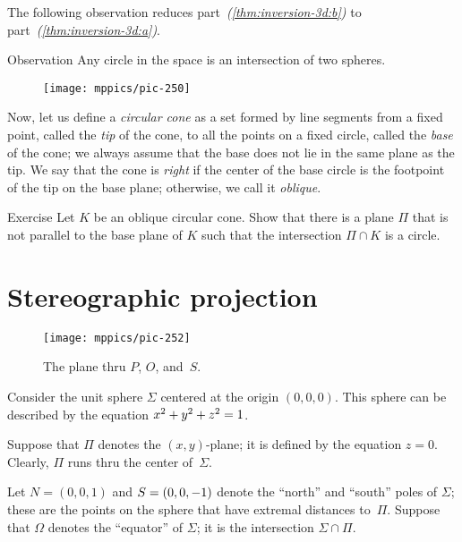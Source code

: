 The following observation reduces part~\textit{(\ref{thm:inversion-3d:b})} to part~\textit{(\ref{thm:inversion-3d:a})}.

\begin{thm}{Observation}
Any circle in the space is an intersection of two spheres.
\end{thm}

{

\begin{wrapfigure}{o}{25mm}
\centering
\texttt{[image: mppics/pic-250]}
\end{wrapfigure}

Now, let us define a \emph{circular cone} as a set formed by line segments from a fixed point, called the \emph{tip} of the cone, to all the points on a fixed circle, called the \emph{base} of the cone;
we always assume that the base does not lie in the same plane as the tip.
We say that the cone is \emph{right} 
if the center of the base circle is the footpoint of the tip on the base plane;
otherwise, we call it \emph{oblique}.

}

\begin{thm}{Exercise}\label{ex:cone}
Let $K$ be an oblique circular cone. Show that there is a plane $\Pi$ that is not parallel to the base plane of $K$ such that the intersection $\Pi\cap K$ is a circle.
\end{thm}


\section{Stereographic projection}

{

\begin{wrapfigure}{r}{48mm}
\vskip-10mm
\centering
\texttt{[image: mppics/pic-252]}
\caption*{The plane thru $P$, $O$, and~$S$.}
\end{wrapfigure}

Consider the unit sphere $\Sigma$ 
centered at the origin $(0,0,0)$.
This sphere can be described by the equation $x^2+y^2+z^2=1$. 

Suppose that $\Pi$ denotes the $(x,y)$-plane;
it is defined by the equation $z = 0$.
Clearly, $\Pi$
runs thru the center of~$\Sigma$.

Let $N = (0, 0, 1)$ and $S=(0, 0, -1)$ denote the ``north'' and ``south'' poles of $\Sigma$;
these are the points on the sphere that have extremal distances to~$\Pi$.
Suppose that $\Omega$ denotes the ``equator'' of $\Sigma$;
it is the intersection $\Sigma\cap\Pi$.

}

